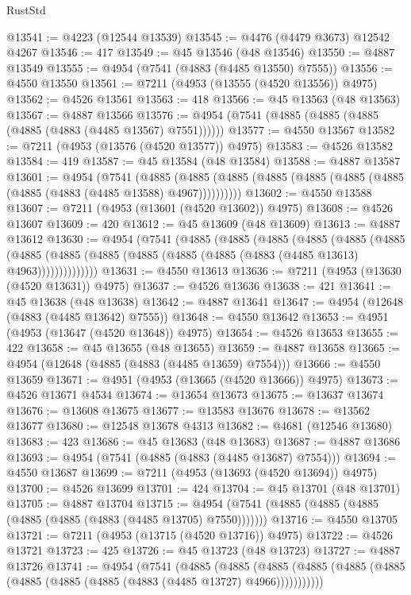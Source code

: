 \begin{lexlean}{RustStd}
\begin{coremodule}
@13541 := @4223 (@12544 @13539)
@13545 := @4476 (@4479 @3673) @12542 @4267
@13546 := 417
@13549 := @45 @13546 (@48 @13546)
@13550 := @4887 @13549
@13555 := @4954 (@7541 (@4883 (@4485 @13550) @7555))
@13556 := @4550 @13550
@13561 := @7211 (@4953 (@13555 (@4520 @13556)) @4975)
@13562 := @4526 @13561
@13563 := 418
@13566 := @45 @13563 (@48 @13563)
@13567 := @4887 @13566
@13576 := @4954 (@7541 (@4885 (@4885 (@4885 (@4885 (@4883 (@4485 @13567) @7551))))))
@13577 := @4550 @13567
@13582 := @7211 (@4953 (@13576 (@4520 @13577)) @4975)
@13583 := @4526 @13582
@13584 := 419
@13587 := @45 @13584 (@48 @13584)
@13588 := @4887 @13587
@13601 := @4954
    (@7541
      (@4885 (@4885 (@4885 (@4885 (@4885 (@4885 (@4885 (@4885 (@4883 (@4485 @13588) @4967))))))))))
@13602 := @4550 @13588
@13607 := @7211 (@4953 (@13601 (@4520 @13602)) @4975)
@13608 := @4526 @13607
@13609 := 420
@13612 := @45 @13609 (@48 @13609)
@13613 := @4887 @13612
@13630 := @4954
    (@7541
      (@4885
        (@4885
          (@4885
            (@4885
              (@4885
                (@4885
                  (@4885
                    (@4885 (@4885 (@4885 (@4885 (@4885 (@4883 (@4485 @13613) @4963))))))))))))))
@13631 := @4550 @13613
@13636 := @7211 (@4953 (@13630 (@4520 @13631)) @4975)
@13637 := @4526 @13636
@13638 := 421
@13641 := @45 @13638 (@48 @13638)
@13642 := @4887 @13641
@13647 := @4954 (@12648 (@4883 (@4485 @13642) @7555))
@13648 := @4550 @13642
@13653 := @4951 (@4953 (@13647 (@4520 @13648)) @4975)
@13654 := @4526 @13653
@13655 := 422
@13658 := @45 @13655 (@48 @13655)
@13659 := @4887 @13658
@13665 := @4954 (@12648 (@4885 (@4883 (@4485 @13659) @7554)))
@13666 := @4550 @13659
@13671 := @4951 (@4953 (@13665 (@4520 @13666)) @4975)
@13673 := @4526 @13671 @4534
@13674 := @13654 @13673
@13675 := @13637 @13674
@13676 := @13608 @13675
@13677 := @13583 @13676
@13678 := @13562 @13677
@13680 := @12548 @13678 @4313
@13682 := @4681 (@12546 @13680)
@13683 := 423
@13686 := @45 @13683 (@48 @13683)
@13687 := @4887 @13686
@13693 := @4954 (@7541 (@4885 (@4883 (@4485 @13687) @7554)))
@13694 := @4550 @13687
@13699 := @7211 (@4953 (@13693 (@4520 @13694)) @4975)
@13700 := @4526 @13699
@13701 := 424
@13704 := @45 @13701 (@48 @13701)
@13705 := @4887 @13704
@13715 := @4954 (@7541 (@4885 (@4885 (@4885 (@4885 (@4885 (@4883 (@4485 @13705) @7550)))))))
@13716 := @4550 @13705
@13721 := @7211 (@4953 (@13715 (@4520 @13716)) @4975)
@13722 := @4526 @13721
@13723 := 425
@13726 := @45 @13723 (@48 @13723)
@13727 := @4887 @13726
@13741 := @4954
    (@7541
      (@4885
        (@4885
          (@4885 (@4885 (@4885 (@4885 (@4885 (@4885 (@4885 (@4883 (@4485 @13727) @4966)))))))))))

\end{coremodule}
\end{lexlean}
